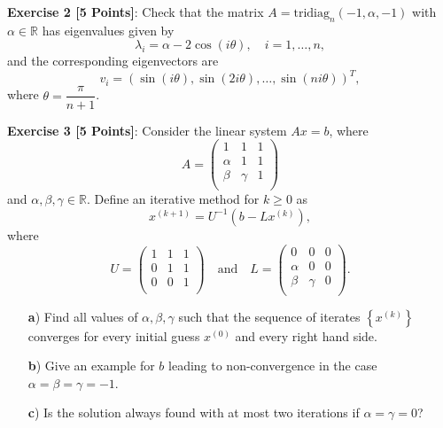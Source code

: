 \documentclass{article}
\begin{document}
\vspace{\baselineskip}
\noindent\textsf{\textbf{Exercise 2 [5 Points]}}: Check that the matrix $A = \mathrm{tridiag}_n \left( -1,\alpha, -1 \right)$ with $\alpha \in \mathbb{R}$ has eigenvalues
given by
\begin{equation}
\lambda_i = \alpha - 2 \cos( i \theta), \quad i= 1,\ldots,n, \nonumber
\end{equation}
and the corresponding eigenvectors are
\begin{equation}
v_i = \left( \sin\left(i\theta\right), \sin\left(2i\theta\right), \ldots, \sin\left(ni\theta\right)\right)^T , \nonumber
\end{equation}
where $\theta = \dfrac{\pi}{n+1}$.

\vspace{\baselineskip}
\noindent\textsf{\textbf{Exercise 3 [5 Points]}}: Consider the linear system $Ax=b$, where
\begin{equation}
A = \left( \begin{array}{ccc}
1 & 1 & 1 \\
\alpha & 1 & 1 \\ 
\beta & \gamma & 1\\
\end{array}
\right) \nonumber
\end{equation}
and $\alpha, \beta, \gamma \in \mathbb{R}$. Define an iterative method for ${k \ge 0}$ as
\begin{equation}
x^{\left(k+1\right)} = U^{-1}\left( b - L x^{\left(k\right)} \right), \nonumber
\end{equation}
where
\begin{equation}
U = \left( \begin{array}{ccc}
1 & 1 & 1 \\
0 & 1 & 1 \\ 
0 & 0 & 1\\
\end{array}
\right) \quad \mbox{and} \quad L = \left( \begin{array}{ccc}
0 & 0 & 0 \\
\alpha & 0 & 0 \\ 
\beta & \gamma & 0\\
\end{array}
\right). \nonumber
\end{equation}
\begin{itemize}
\item[\textsf{\textbf{a})}] Find all values of $\alpha, \beta, \gamma$ such that the sequence of iterates $\left\{ x^{(k)} \right\}$ converges for every initial guess $x^{(0)}$ and every right hand side.
\item[\textsf{\textbf{b})}] Give an example for $b$ leading to non-convergence in the case ${\alpha = \beta = \gamma = -1}$.
\item[\textsf{\textbf{c})}] Is the solution always found with at most two iterations if ${\alpha = \gamma = 0}$?
\end{itemize} 
\end{document}
